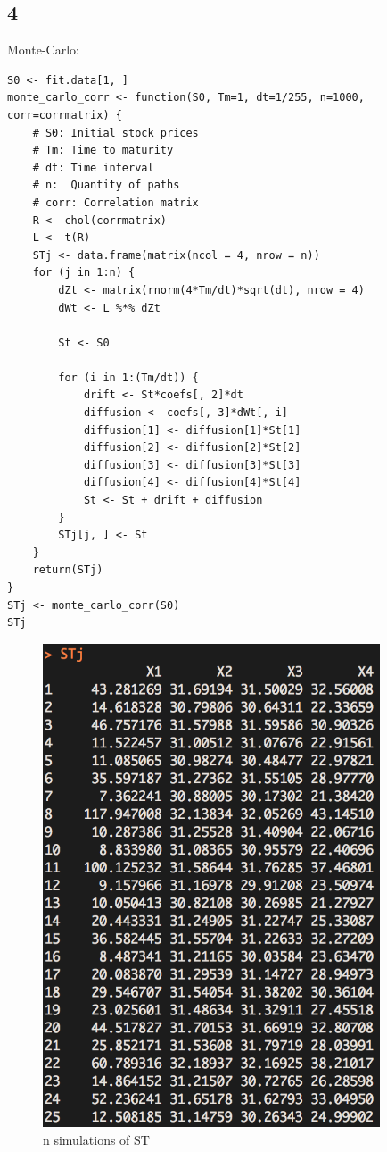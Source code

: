 \documentclass{article}
\begin{document}
\subsection{4}
Monte-Carlo:
\begin{verbatim}
S0 <- fit.data[1, ]
monte_carlo_corr <- function(S0, Tm=1, dt=1/255, n=1000, corr=corrmatrix) {
    # S0: Initial stock prices
    # Tm: Time to maturity
    # dt: Time interval
    # n:  Quantity of paths
    # corr: Correlation matrix
    R <- chol(corrmatrix)
    L <- t(R)
    STj <- data.frame(matrix(ncol = 4, nrow = n))
    for (j in 1:n) {
        dZt <- matrix(rnorm(4*Tm/dt)*sqrt(dt), nrow = 4)
        dWt <- L %*% dZt
        
        St <- S0
        
        for (i in 1:(Tm/dt)) {
            drift <- St*coefs[, 2]*dt
            diffusion <- coefs[, 3]*dWt[, i]
            diffusion[1] <- diffusion[1]*St[1]
            diffusion[2] <- diffusion[2]*St[2]
            diffusion[3] <- diffusion[3]*St[3]
            diffusion[4] <- diffusion[4]*St[4]
            St <- St + drift + diffusion
        }
        STj[j, ] <- St
    }
    return(STj)
}
STj <- monte_carlo_corr(S0)
STj

\end{verbatim}
\begin{figure}[h] 
\begin{center} 
\includegraphics[width = 10cm]{ST.png}  
\caption{n simulations of ST} 
\end{center} 
\end{figure}
\end{document}
